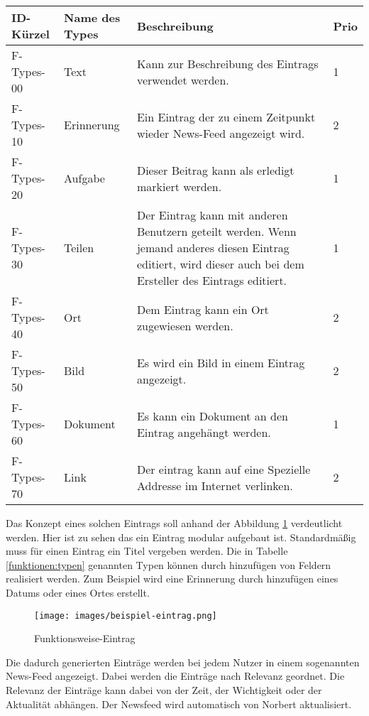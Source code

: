\begin{tabularx}{\textwidth}{|l|l|X|l|}
    \toprule
    \textbf{ID-Kürzel} & \textbf{Name des Types} & \textbf{Beschreibung} & \textbf{Prio}\\
    \midrule
    \endhead
    \hline
    \caption{Typen von Einträgen}
    \label{funktionen:typen}
    \endfoot
    F-Types-00 & Text & Kann zur Beschreibung des Eintrags verwendet werden. & 1\\
    F-Types-10 & Erinnerung & Ein Eintrag der zu einem Zeitpunkt wieder News-Feed angezeigt wird. & 2 \\
    F-Types-20 & Aufgabe & Dieser Beitrag kann als erledigt markiert werden. & 1\\
    F-Types-30 & Teilen & Der Eintrag kann mit anderen Benutzern geteilt werden.
    Wenn jemand anderes diesen Eintrag editiert, wird dieser auch bei dem Ersteller des Eintrags editiert. & 1\\
    F-Types-40 & Ort & Dem Eintrag kann ein Ort zugewiesen werden. & 2 \\
    F-Types-50 & Bild & Es wird ein Bild in einem Eintrag angezeigt. & 2 \\
    F-Types-60 & Dokument & Es kann ein Dokument an den Eintrag angehängt werden. & 1\\
    F-Types-70 & Link & Der eintrag kann auf eine Spezielle Addresse im Internet verlinken. & 2\\
\end{tabularx}

Das Konzept eines solchen Eintrags soll anhand der Abbildung \ref{funktionen:Eintrag} verdeutlicht werden. 
Hier ist zu sehen das ein Eintrag modular aufgebaut ist. Standardmäßig muss für einen Eintrag ein Titel vergeben werden.
Die in Tabelle \ref{funktionen:typen} genannten Typen können durch hinzufügen von Feldern realisiert werden. Zum Beispiel wird eine Erinnerung durch hinzufügen eines Datums oder eines Ortes erstellt.

\begin{figure}[H]
    \centering
    \texttt{[image: images/beispiel-eintrag.png]}
    \caption{Funktionsweise-Eintrag}
    \label{funktionen:Eintrag}

\end{figure}

Die dadurch generierten Einträge werden bei jedem Nutzer in einem sogenannten News-Feed angezeigt.
Dabei werden die Einträge nach Relevanz geordnet.
Die Relevanz der Einträge kann dabei von der Zeit, der Wichtigkeit oder der Aktualität abhängen.
Der Newsfeed wird automatisch von Norbert aktualisiert.


